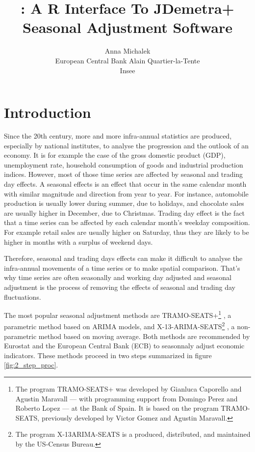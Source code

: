 \documentclass[article]{jss}
\author{
Anna Michalek\\European Central Bank \And Alain Quartier-la-Tente\\Insee
}
\title{\pkg{RJDemetra}: A R Interface To JDemetra+ Seasonal Adjustment Software}
\begin{document}
\hypertarget{introduction}{%
\section{Introduction}\label{introduction}}

Since the 20th century, more and more infra-annual statistics are
produced, especially by national institutes, to analyse the progression
and the outlook of an economy. It is for example the case of the gross
domestic product (GDP), unemployment rate, household consumption of
goods and industrial production indices. However, most of those time
series are affected by seasonal and trading day effects. A seasonal
effects is an effect that occur in the same calendar month with similar
magnitude and direction from year to year. For instance, automobile
production is usually lower during summer, due to holidays, and
chocolate sales are usually higher in December, due to Christmas.
Trading day effect is the fact that a time series can be affected by
each calendar month's weekday composition. For example retail sales are
usually higher on Saturday, thus they are likely to be higher in months
with a surplus of weekend days.

Therefore, seasonal and trading days effects can make it difficult to
analyse the infra-annual movements of a time series or to make spatial
comparison. That's why time series are often seasonally and working day
adjusted and seasonal adjustment is the process of removing the effects
of seasonal and trading day fluctuations.

The most popular seasonal adjustment methods are TRAMO-SEATS+\footnote{The
  program TRAMO-SEATS+ was developed by Gianluca Caporello and Agustin
  Maravall --- with programming support from Domingo Perez and Roberto
  Lopez --- at the Bank of Spain. It is based on the program
  TRAMO-SEATS, previously developed by Victor Gomez and Agustin
  Maravall.} \citep{gomez1996programs, caporello2004program}, a
parametric method based on ARIMA models, and X-13-ARIMA-SEATS\footnote{The
  program X-13ARIMA-SEATS is a produced, distributed, and maintained by
  the US-Census Bureau.} \citep{findleyx12, ladiray1999x11en}, a
non-parametric method based on moving average. Both methods are
recommended by Eurostat and the European Central Bank (ECB) to
seasonnaly adjust economic indicators. These methods proceed in two
steps summarized in figure \ref{fig:2_step_proc}.
\end{document}
